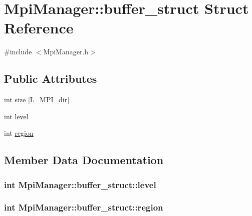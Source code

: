\hypertarget{struct_mpi_manager_1_1buffer__struct}{}\section{Mpi\+Manager\+:\+:buffer\+\_\+struct Struct Reference}
\label{struct_mpi_manager_1_1buffer__struct}


{\ttfamily \#include $<$Mpi\+Manager.\+h$>$}

\subsection*{Public Attributes}
\begin{DoxyCompactItemize}
\item 
int \hyperlink{struct_mpi_manager_1_1buffer__struct_aea0037fce808f601ae9c1e48926dbd0e}{size} \mbox{[}\hyperlink{definitions_8h_a3310be18f0cfda9ca2a17c51518a97e9}{L\+\_\+\+M\+P\+I\+\_\+dir}\mbox{]}
\item 
int \hyperlink{struct_mpi_manager_1_1buffer__struct_adc6bb3b15665e3fb5834e6134395e1f9}{level}
\item 
int \hyperlink{struct_mpi_manager_1_1buffer__struct_a81730a85a03630880e8c378fcb8d3298}{region}
\end{DoxyCompactItemize}


\subsection{Member Data Documentation}
\subsubsection[{\texorpdfstring{level}{level}}]{\setlength{\rightskip}{0pt plus 5cm}int Mpi\+Manager\+::buffer\+\_\+struct\+::level}\hypertarget{struct_mpi_manager_1_1buffer__struct_adc6bb3b15665e3fb5834e6134395e1f9}{}\label{struct_mpi_manager_1_1buffer__struct_adc6bb3b15665e3fb5834e6134395e1f9}
\subsubsection[{\texorpdfstring{region}{region}}]{\setlength{\rightskip}{0pt plus 5cm}int Mpi\+Manager\+::buffer\+\_\+struct\+::region}\hypertarget{struct_mpi_manager_1_1buffer__struct_a81730a85a03630880e8c378fcb8d3298}{}\label{struct_mpi_manager_1_1buffer__struct_a81730a85a03630880e8c378fcb8d3298}
